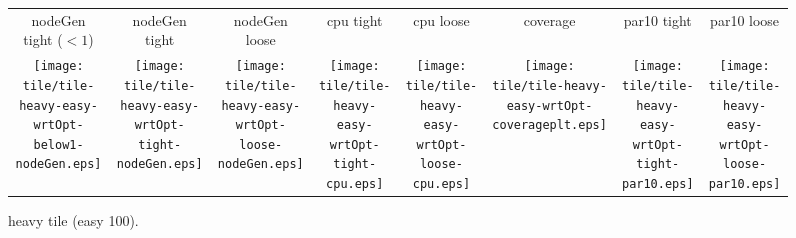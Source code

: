 \documentclass[a4paper,landscape]{article}
\begin{document}
\begin{figure}[t]
	\centering
	\begin{tabular}{c c c c c c c c}
        nodeGen tight ($<1$) & nodeGen tight & nodeGen loose & cpu
        tight & cpu loose & coverage & par10 tight & par10 loose\\
	   \begin{minipage}{\cpufigureplotwidth}
        \texttt{[image: tile/tile-heavy-easy-wrtOpt-below1-nodeGen.eps]}
        \end{minipage}&
        \begin{minipage}{\cpufigureplotwidth}
      \texttt{[image: tile/tile-heavy-easy-wrtOpt-tight-nodeGen.eps]}
      \end{minipage}&
        \begin{minipage}{\cpufigureplotwidth}
        \texttt{[image: tile/tile-heavy-easy-wrtOpt-loose-nodeGen.eps]}
        \end{minipage}&
        \begin{minipage}{\cpufigureplotwidth}
        \texttt{[image: tile/tile-heavy-easy-wrtOpt-tight-cpu.eps]}
        \end{minipage}&
        \begin{minipage}{\cpufigureplotwidth}
        \texttt{[image: tile/tile-heavy-easy-wrtOpt-loose-cpu.eps]}
        \end{minipage}&
        \begin{minipage}{\cpufigureplotwidth}
        \texttt{[image: tile/tile-heavy-easy-wrtOpt-coverageplt.eps]}
        \end{minipage}&
        \begin{minipage}{\cpufigureplotwidth}
        \texttt{[image: tile/tile-heavy-easy-wrtOpt-tight-par10.eps]}
        \end{minipage}&
        \begin{minipage}{\cpufigureplotwidth}
        \texttt{[image: tile/tile-heavy-easy-wrtOpt-loose-par10.eps]}
        \end{minipage}
	\end{tabular}
\caption{heavy tile (easy 100).}
\label{fig:tile-heavy-easy}
\end{figure}
\end{document}
